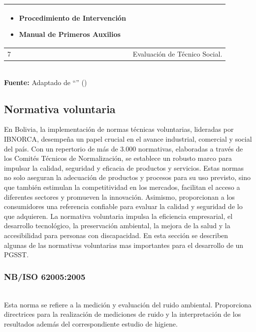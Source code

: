 \begin{table}[htpb]
\begin{center}
\begin{tabular}{|m{2cm}| m{14cm}|}
\begin{itemize}[noitemsep,topsep=0pt,parsep=0pt,partopsep=0pt]
                \item Procedimiento de Intervención
                \item Manual de Primeros Auxilios 
                \vspace*{-\baselineskip}
            \end{itemize}
            \\ \hline
            7 & Evaluación de Técnico Social.  \\
			\hline
		\end{tabular}\\[0.5cm]
		\footnotesize{\textbf{Fuente:} Adaptado de ``'' (\citeyear{cahuasiquitadiseno})}
	\end{center}
\end{table}

\subsection{Normativa voluntaria}
En Bolivia, la implementación de normas técnicas voluntarias, lideradas por IBNORCA, desempeña un papel crucial en el avance industrial, comercial y social del país. Con un repertorio de más de 3.000 normativas, elaboradas a través de los Comités Técnicos de Normalización, se establece un robusto marco para impulsar la calidad, seguridad y eficacia de productos y servicios. Estas normas no solo aseguran la adecuación de productos y procesos para su uso previsto, sino que también estimulan la competitividad en los mercados, facilitan el acceso a diferentes sectores y promueven la innovación. Asimismo, proporcionan a los consumidores una referencia confiable para evaluar la calidad y seguridad de lo que adquieren. La normativa voluntaria impulsa la eficiencia empresarial, el desarrollo tecnológico, la preservación ambiental, la mejora de la salud y la accesibilidad para personas con discapacidad. En esta sección se describen algunas de las normativas voluntarias mas importantes para el desarrollo de un PGSST.

\subsubsection{NB/ISO 62005:2005}\hfill\\ %
\indent
Esta norma se refiere a la medición y evaluación del ruido ambiental. Proporciona directrices para la realización de mediciones de ruido y la interpretación de los resultados además del correspondiente estudio de higiene.

